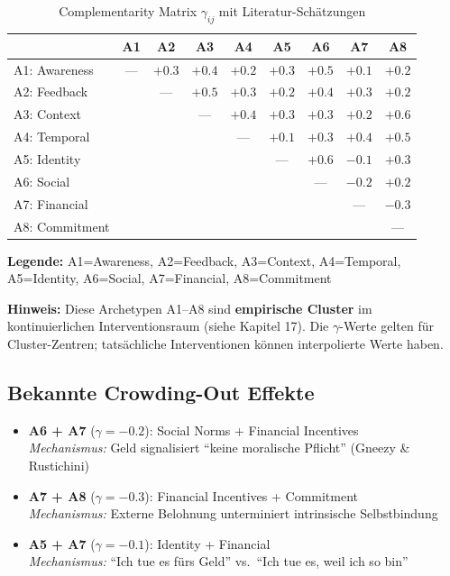 \begin{table}[htbp]
\centering
\caption{Complementarity Matrix $\gamma_{ij}$ mit Literatur-Schätzungen}
\label{tab:20-gamma-matrix}
\renewcommand{\arraystretch}{1.2}
\footnotesize
\begin{tabular}{@{}lcccccccc@{}}
\toprule
& \textbf{A1} & \textbf{A2} & \textbf{A3} & \textbf{A4} & \textbf{A5} & \textbf{A6} & \textbf{A7} & \textbf{A8} \\
\midrule
A1: Awareness & --- & $+0.3$ & $+0.4$ & $+0.2$ & $+0.3$ & \cellcolor{green!25}$+0.5$ & $+0.1$ & $+0.2$ \\
A2: Feedback & & --- & \cellcolor{green!25}$+0.5$ & $+0.3$ & $+0.2$ & $+0.4$ & $+0.3$ & $+0.2$ \\
A3: Context & & & --- & $+0.4$ & $+0.3$ & $+0.3$ & $+0.2$ & \cellcolor{green!25}$+0.6$ \\
A4: Temporal & & & & --- & $+0.1$ & $+0.3$ & $+0.4$ & \cellcolor{green!25}$+0.5$ \\
A5: Identity & & & & & --- & \cellcolor{green!25}$+0.6$ & $-0.1$ & $+0.3$ \\
A6: Social & & & & & & --- & \cellcolor{red!25}$-0.2$ & $+0.2$ \\
A7: Financial & & & & & & & --- & \cellcolor{red!25}$-0.3$ \\
A8: Commitment & & & & & & & & --- \\
\bottomrule
\end{tabular}
\end{table}

\textbf{Legende:} A1=Awareness, A2=Feedback, A3=Context, A4=Temporal, A5=Identity, A6=Social, A7=Financial, A8=Commitment

\textbf{Hinweis:} Diese Archetypen A1--A8 sind \textbf{empirische Cluster} im kontinuierlichen Interventionsraum (siehe Kapitel 17). Die $\gamma$-Werte gelten f\"{u}r Cluster-Zentren; tats\"{a}chliche Interventionen k\"{o}nnen interpolierte Werte haben.

\subsection{Bekannte Crowding-Out Effekte}

\begin{tcolorbox}[colback=red!10!white, colframe=red!75!black,
    title=\textbf{Warnung: Dokumentierte Crowding-Out Effekte}]
\begin{itemize}[nosep]
\item \textbf{A6 + A7} ($\gamma = -0.2$): Social Norms + Financial Incentives\\
  \textit{Mechanismus:} Geld signalisiert ``keine moralische Pflicht'' (Gneezy \& Rustichini)
\item \textbf{A7 + A8} ($\gamma = -0.3$): Financial Incentives + Commitment\\
  \textit{Mechanismus:} Externe Belohnung unterminiert intrinsische Selbstbindung
\item \textbf{A5 + A7} ($\gamma = -0.1$): Identity + Financial\\
  \textit{Mechanismus:} ``Ich tue es f\"{u}rs Geld'' vs.\ ``Ich tue es, weil ich so bin''
\end{itemize}
\end{tcolorbox}


